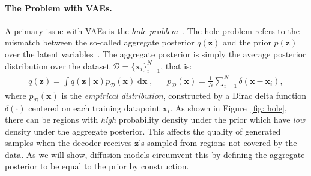 \paragraph{The Problem with VAEs.}
%
A primary issue with VAEs is the \textit{hole problem}~\citep{rezende2018taming}. The hole problem refers to the mismatch between the so-called aggregate posterior $q(\mathbf{z})$ and the prior $p(\mathbf{z})$ over the latent variables~\citep{makhzani2015adversarial,hoffman2016elbo}. The aggregate posterior is simply the average posterior distribution over the dataset $\mathcal{D} = \{\mathbf{x}_i\}_{i=1}^N$, that is:
%
\begin{align}
    &&q(\mathbf{z}) = \int q(\mathbf{z} \mid \mathbf{x})p_\mathcal{D}(\mathbf{x}) \mathop{\mathrm{d}\mathbf{x}} 
    , && p_{\mathcal{D}}(\mathbf{x}) = \frac{1}{N}\sum_{i=1}^N \delta(\mathbf{x} - \mathbf{x}_i),&&
\end{align}
%
where $p_\mathcal{D}(\mathbf{x})$ is the \textit{empirical distribution}, constructed by a Dirac delta function $\delta(\cdot)$ centered on each training datapoint $\mathbf{x}_i$. As shown in Figure~\ref{fig: hole}, there can be regions with \textit{high} probability density under the prior which have \textit{low} density under the aggregate posterior. This affects the quality of generated samples when the decoder receives $\mathbf{z}$'s sampled from regions not covered by the data. As we will show, diffusion models circumvent this by defining the aggregate posterior to be equal to the prior by construction.